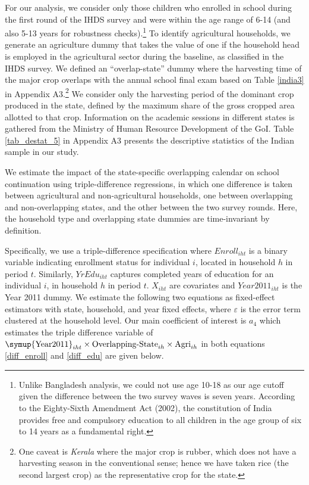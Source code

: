 \documentclass[12pt,letterpaper]{article}
\newcommand{\0}{\ensuremath{\mbox{\boldmath $0$}}}
\begin{document}
For our analysis, we consider only those children who enrolled in school during the first round of the IHDS survey and were within the age range of 6-14 (and also 5-13 years for robustness checks).\footnote{Unlike Bangladesh analysis, we could not use age 10-18 as our age cutoff given the difference between the two survey waves is seven years. According to the Eighty-Sixth Amendment Act (2002), the constitution of India provides free and compulsory education to all children in the age group of six to 14 years as a fundamental right.} To identify agricultural households, we generate an agriculture dummy that takes the value of one if the household head is employed in the agricultural sector during the baseline, as classified in the IHDS survey.  We defined an ``overlap-state'' dummy where the harvesting time of the major crop overlaps with the annual school final exam based on Table \ref{india3} in Appendix A3.\footnote{One caveat is \textit{Kerala} where the major crop is rubber, which does not have a harvesting season in the conventional sense; hence we have taken rice (the second largest crop) as the representative crop for the state.} We consider only the harvesting period of the dominant crop produced in the state, defined by the maximum share of the gross cropped area allotted to that crop. Information on the academic sessions in different states is gathered from the Ministry of Human Resource Development of the GoI. Table \ref{tab_destat_5} in Appendix A3 presents the descriptive statistics of the Indian sample in our study.

We estimate the impact of the state-specific overlapping calendar on school continuation using triple-difference regressions, in which one difference is taken between agricultural and non-agricultural households, one between overlapping and non-overlapping states, and the other between the two survey rounds. Here, the household type and overlapping state dummies are time-invariant by definition.

Specifically, we use a triple-difference specification where ${Enroll}_{iht}$ is a binary variable indicating enrollment status for individual $i$, located in household $h$ in period $t$. Similarly, ${YrEdu}_{iht}$ captures completed years of education for an individual $i$, in household $h$ in period $t$. ${X}_{iht}$ are covariates and ${Year2011}_{iht}$ is the Year 2011 dummy. We estimate the following two equations as fixed-effect estimators with state, household, and year fixed effects, where $\varepsilon$ is the error term clustered at the household level. Our main coefficient of interest is $a_4$ which estimates the triple difference variable of $\textnormal\symup{Year2011}_{iht}\times \textnormal{Overlapping-State}_{ih}\times\textnormal{Agri}_{ih}$ in both equations \ref{diff_enroll} and \ref{diff_edu} are given below.
\end{document}
